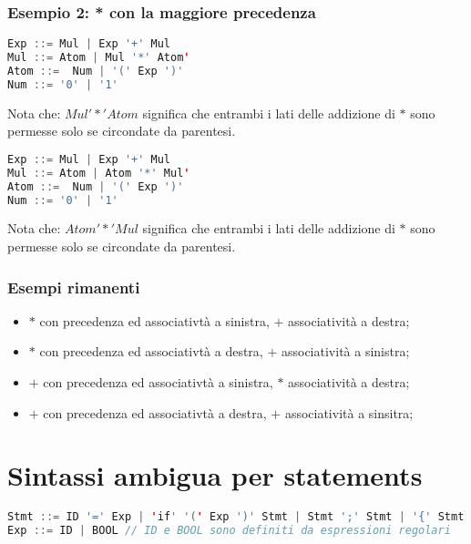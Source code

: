 \subsubsection{Esempio 2: * con la maggiore precedenza}
\begin{lstlisting}[language=Java, caption={Associative a sinistra non ambigue}]
Exp ::= Mul | Exp '+' Mul
Mul ::= Atom | Mul '*' Atom'
Atom ::=  Num | '(' Exp ')'
Num ::= '0' | '1'
\end{lstlisting}
Nota che: $Mul '*' Atom $ significa che entrambi i lati delle addizione di $*$
sono permesse solo se circondate da parentesi.

\begin{lstlisting}[language=Java, caption={Associative a destra non ambigue}]
Exp ::= Mul | Exp '+' Mul
Mul ::= Atom | Atom '*' Mul'
Atom ::=  Num | '(' Exp ')'
Num ::= '0' | '1'
\end{lstlisting}
Nota che: $Atom '*' Mul $ significa che entrambi i lati delle addizione di $*$
sono permesse solo se circondate da parentesi.

\subsubsection{Esempi rimanenti}
\begin{itemize}
  \item $*$ con precedenza ed associativtà  a sinistra, $+$ associatività a
    destra;
  \item $*$ con precedenza ed associativtà  a destra, $+$ associatività a
    sinistra;
  \item $+$ con precedenza ed associativtà  a sinistra, $*$ associatività a
    destra;
  \item $+$ con precedenza ed associativtà  a destra, $+$ associatività a
    sinsitra;
\end{itemize}

\section{Sintassi ambigua per statements}
\begin{lstlisting}[language=Java, caption={Esempio di ambiguità per gli statements}]
Stmt ::= ID '=' Exp | 'if' '(' Exp ')' Stmt | Stmt ';' Stmt | '{' Stmt '}'
Exp ::= ID | BOOL // ID e BOOL sono definiti da espressioni regolari
\end{lstlisting}
